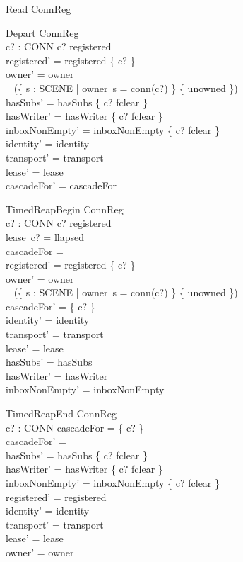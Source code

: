 \documentclass[a4paper,10pt,fleqn]{article}
\begin{document}
\begin{schema}{Read}
  \Xi ConnReg
\end{schema}

\begin{schema}{Depart}
  \Delta ConnReg \\
  c? : CONN
\where
  c? \in registered \\
  registered' = registered \setminus \{ c? \} \\
  owner' = owner \oplus \\
  \quad~ (\{ s : SCENE | owner~s = conn(c?) \} \cross \{ unowned \}) \\
  hasSubs' = hasSubs \oplus \{ c? \mapsto fclear \} \\
  hasWriter' = hasWriter \oplus \{ c? \mapsto fclear \} \\
  inboxNonEmpty' = inboxNonEmpty \oplus \{ c? \mapsto fclear \} \\
  identity' = identity \\
  transport' = transport \\
  lease' = lease \\
  cascadeFor' = cascadeFor
\end{schema}

\begin{schema}{TimedReapBegin}
  \Delta ConnReg \\
  c? : CONN
\where
  c? \in registered \\
  lease~c? = llapsed \\
  cascadeFor = \emptyset \\
  registered' = registered \setminus \{ c? \} \\
  owner' = owner \oplus \\
  \quad~ (\{ s : SCENE | owner~s = conn(c?) \} \cross \{ unowned \}) \\
  cascadeFor' = \{ c? \} \\
  identity' = identity \\
  transport' = transport \\
  lease' = lease \\
  hasSubs' = hasSubs \\
  hasWriter' = hasWriter \\
  inboxNonEmpty' = inboxNonEmpty
\end{schema}

\begin{schema}{TimedReapEnd}
  \Delta ConnReg \\
  c? : CONN
\where
  cascadeFor = \{ c? \} \\
  cascadeFor' = \emptyset \\
  hasSubs' = hasSubs \oplus \{ c? \mapsto fclear \} \\
  hasWriter' = hasWriter \oplus \{ c? \mapsto fclear \} \\
  inboxNonEmpty' = inboxNonEmpty \oplus \{ c? \mapsto fclear \} \\
  registered' = registered \\
  identity' = identity \\
  transport' = transport \\
  lease' = lease \\
  owner' = owner
\end{schema}
\end{document}
